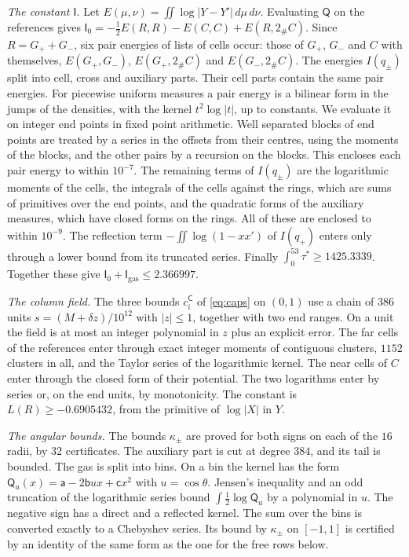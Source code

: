 \emph{The constant $\mathsf I$.} Let $E(\mu,\nu)=\iint\log|Y-Y'|\,d\mu\,d\nu$. Evaluating $\mathsf Q$ on the references gives $\mathsf I_0=-\frac12E(R,R)-E(C,C)+E(R,2_\#C)$. Since $R=G_++G_-$, six pair
energies of lists of cells occur: those of $G_+$, $G_-$ and $C$ with themselves, $E(G_+,G_-)$, $E(G_+,2_\#C)$ and $E(G_-,2_\#C)$. The energies $I(q_\pm)$ split into cell, cross and auxiliary parts. Their cell parts contain the same
pair energies. For piecewise uniform measures a pair energy is a bilinear form in the jumps of the densities, with the kernel $t^2\log|t|$, up to constants. We evaluate it on integer end points in fixed point arithmetic. Well separated blocks of end points are
treated by a series in the offsets from their centres, using the moments of the blocks, and the other pairs by a recursion on the blocks. This encloses each pair energy to within $10^{-7}$. The remaining terms of $I(q_\pm)$ are the logarithmic moments of the cells,
the integrals of the cells against the rings, which are sums of primitives over the end points, and the quadratic forms of the auxiliary measures, which have closed forms on the rings. All of these are enclosed to within $10^{-9}$. The reflection term $-\iint\log(1-xx')$ of $I(q_+)$
enters only through a lower bound from its truncated series. Finally $\int_0^{53}\tau^*\ge1425.3339$. Together these give $\mathsf I_0+\mathsf I_{\mathrm{gas}}\le2.366997$.

\emph{The column field.} The three bounds $c^{\mathsf C}_i$ of \eqref{eq:caps} on $(0,1)$ use a chain of $386$ units $s=(M+\delta z)/10^{12}$ with $|z|\le1$, together with two end ranges. On a unit the field is at most an integer polynomial in $z$ plus an explicit
error. The far cells of the references enter through exact integer moments of contiguous clusters, $1152$ clusters in all, and the Taylor series of the logarithmic kernel. The near cells of $C$ enter through the closed form of their potential. The two logarithms enter by
series or, on the end units, by monotonicity. The constant is $L(R)\ge-0.6905432$, from the primitive of $\log|X|$ in $Y$.

\emph{The angular bounds.} The bounds $\kappa_\pm$ are proved for both signs on each of the $16$ radii, by $32$ certificates. The auxiliary part is cut at degree $384$, and its tail is bounded. The gas is split into bins. On a bin the kernel has the form
$\mathsf Q_u(x)=\mathsf a-2\mathsf bux+\mathsf cx^2$ with $u=\cos\theta$. Jensen's inequality and an odd truncation of the logarithmic series bound $\int\frac12\log\mathsf Q_u$ by a polynomial in $u$. The negative sign has a direct and a reflected kernel. The sum over the bins
is converted exactly to a Chebyshev series. Its bound by $\kappa_\pm$ on $[-1,1]$ is certified by an identity of the same form as the one for the free rows below.

